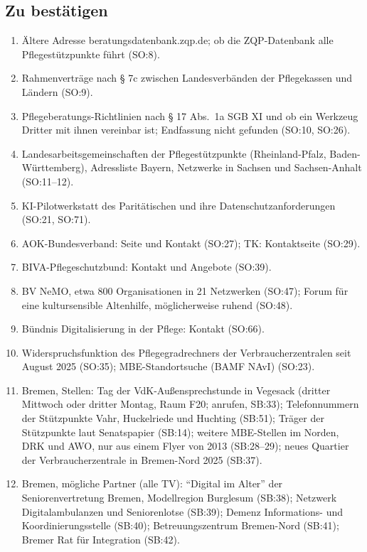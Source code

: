 \documentclass[10pt,parskip=half-]{scrartcl}
\begin{document}
\subsection{Zu bestätigen}
{\small
\begin{enumerate}[nosep]
  \item Ältere Adresse beratungsdatenbank.zqp.de; ob die ZQP-Datenbank alle Pflegestützpunkte
    führt (SO:8).
  \item Rahmenverträge nach § 7c zwischen Landesverbänden der Pflegekassen und Ländern (SO:9).
  \item Pflegeberatungs-Richtlinien nach § 17 Abs.~1a SGB XI und ob ein Werkzeug Dritter mit
    ihnen vereinbar ist; Endfassung nicht gefunden (SO:10, SO:26).
  \item Landesarbeitsgemeinschaften der Pflegestützpunkte (Rheinland-Pfalz,
    Baden-Württemberg), Adressliste Bayern, Netzwerke in Sachsen und Sachsen-Anhalt (SO:11--12).
  \item KI-Pilotwerkstatt des Paritätischen und ihre Datenschutzanforderungen (SO:21, SO:71).
  \item AOK-Bundesverband: Seite und Kontakt (SO:27); TK: Kontaktseite (SO:29).
  \item BIVA-Pflegeschutzbund: Kontakt und Angebote (SO:39).
  \item BV NeMO, etwa 800 Organisationen in 21 Netzwerken (SO:47); Forum für eine
    kultursensible Altenhilfe, möglicherweise ruhend (SO:48).
  \item Bündnis Digitalisierung in der Pflege: Kontakt (SO:66).
  \item Widerspruchsfunktion des Pflegegradrechners der Verbraucherzentralen seit August 2025
    (SO:35); MBE-Standortsuche (BAMF NAvI) (SO:23).
  \item Bremen, Stellen: Tag der VdK-Außensprechstunde in Vegesack (dritter Mittwoch oder dritter
    Montag, Raum F20; anrufen, SB:33); Telefonnummern der Stützpunkte Vahr, Huckelriede und
    Huchting (SB:51); Träger der Stützpunkte laut Senatspapier (SB:14); weitere MBE-Stellen im
    Norden, DRK und AWO, nur aus einem Flyer von 2013 (SB:28--29); neues Quartier der
    Verbraucherzentrale in Bremen-Nord 2025 (SB:37).
  \item Bremen, mögliche Partner (alle TV): \enquote{Digital im Alter} der Seniorenvertretung
    Bremen, Modellregion Burglesum (SB:38); Netzwerk Digitalambulanzen und Seniorenlotse (SB:39);
    Demenz Informations- und Koordinierungsstelle (SB:40); Betreuungszentrum Bremen-Nord
    (SB:41); Bremer Rat für Integration (SB:42).
\end{enumerate}
}
\end{document}
